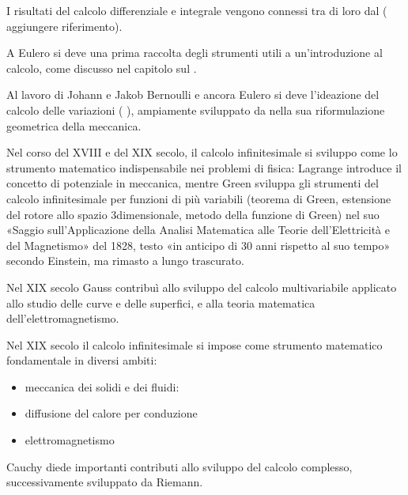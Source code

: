 \documentclass[letterpaper,10pt,italian]{jupyterBook}
\begin{document}
\sphinxAtStartPar
I risultati del calcolo differenziale e integrale vengono connessi tra di loro dal  ( aggiungere riferimento).

\sphinxAtStartPar
A Eulero si deve una prima raccolta degli strumenti utili a un’introduzione al calcolo, come discusso nel capitolo sul {\hyperref[\detokenize{ch/precalculus:math-hs-precalculus}]{}}.

\sphinxAtStartPar
Al lavoro di Johann e Jakob Bernoulli e ancora Eulero si deve l’ideazione del calcolo delle variazioni ( ), ampiamente sviluppato da  nella sua riformulazione geometrica della meccanica.

\sphinxAtStartPar
Nel corso del XVIII e del XIX secolo, il calcolo infinitesimale si sviluppo come lo strumento matematico indispensabile nei problemi di fisica: Lagrange introduce il concetto di potenziale in meccanica, mentre Green sviluppa gli strumenti del calcolo infinitesimale per funzioni di più variabili (teorema di Green, estensione del rotore allo spazio 3\sphinxhyphen{}dimensionale, metodo della funzione di Green) nel suo «Saggio sull’Applicazione della Analisi Matematica alle Teorie dell’Elettricità e del Magnetismo» del 1828, testo «in anticipo di 30 anni rispetto al suo tempo» secondo Einstein, ma rimasto a lungo trascurato.

\sphinxAtStartPar
Nel XIX secolo Gauss contribuì allo sviluppo del calcolo multivariabile applicato allo studio delle curve e delle superfici, e alla teoria matematica dell’elettromagnetismo.

\sphinxAtStartPar
Nel XIX secolo il calcolo infinitesimale si impose come strumento matematico fondamentale in diversi ambiti:
\begin{itemize}
\item {} 
\sphinxAtStartPar
meccanica dei solidi e dei fluidi:

\item {} 
\sphinxAtStartPar
diffusione del calore per conduzione

\item {} 
\sphinxAtStartPar
elettromagnetismo

\end{itemize}

\sphinxAtStartPar
Cauchy diede importanti contributi allo sviluppo del calcolo complesso, successivamente sviluppato da Riemann.
\end{document}

